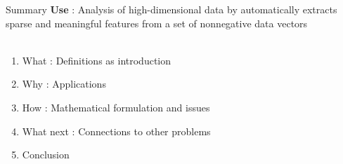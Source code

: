 \begin{frame}{Summary}
    \textbf{Use} : Analysis of high-dimensional data by automatically extracts sparse and meaningful features from a set of nonnegative data vectors\\
    ~\\
    \begin{enumerate}
        \item What : Definitions as introduction
        \item Why : Applications
        \item How : Mathematical formulation and issues
        \item What next : Connections to other problems %
        \item Conclusion
    \end{enumerate}
\end{frame}


